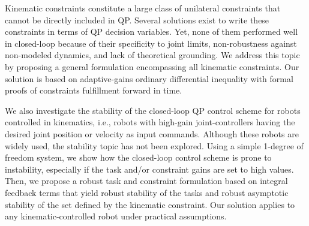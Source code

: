\noindent
Kinematic constraints constitute a large class of unilateral constraints that cannot be directly included in QP. Several solutions exist to write these constraints in terms of QP decision variables. Yet, none of them performed well in closed-loop because of their specificity to joint limits, non-robustness against non-modeled dynamics, and lack of theoretical grounding. We address this topic by proposing a general formulation encompassing all kinematic constraints. Our solution is based on adaptive-gains ordinary differential inequality with formal proofs of constraints fulfillment forward in time.

\noindent
We also investigate the stability of the closed-loop QP control scheme for robots controlled in kinematics, i.e., robots with high-gain joint-controllers having the desired joint position or velocity as input commands. Although these robots are widely used, the stability topic has not been explored. Using a simple 1-degree of freedom system, we show how the closed-loop control scheme is prone to instability, especially if the task and/or constraint gains are set to high values. Then, we propose a robust task and constraint formulation based on integral feedback terms that yield robust stability of the tasks and robust asymptotic stability of the set defined by the kinematic constraint. Our solution applies to any kinematic-controlled robot under practical assumptions.

